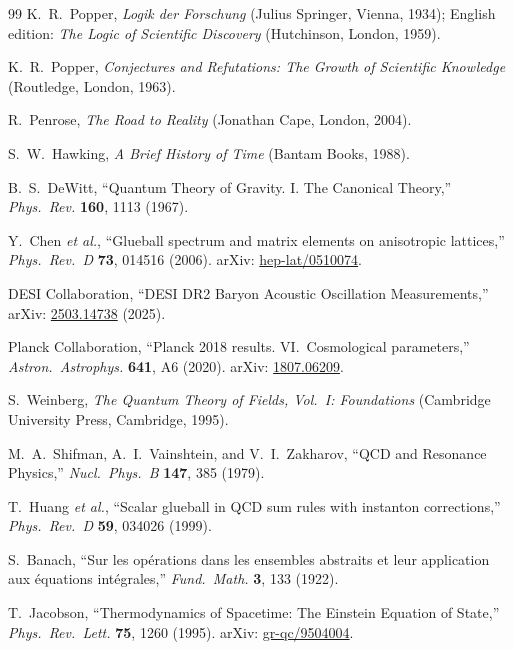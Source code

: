 \documentclass[12pt,a4paper,twoside]{article}
\theoremstyle{plain}
\theoremstyle{definition}
\theoremstyle{remark}
\begin{document}
\begin{thebibliography}{99}
K.~R.~Popper,
\emph{Logik der Forschung} (Julius Springer, Vienna, 1934);
English edition: \emph{The Logic of Scientific Discovery}
(Hutchinson, London, 1959).

K.~R.~Popper,
\emph{Conjectures and Refutations: The Growth of Scientific Knowledge}
(Routledge, London, 1963).

R.~Penrose,
\emph{The Road to Reality} (Jonathan Cape, London, 2004).

S.~W.~Hawking,
\emph{A Brief History of Time} (Bantam Books, 1988).

B.~S.~DeWitt,
``Quantum Theory of Gravity. I. The Canonical Theory,''
\emph{Phys.\ Rev.} \textbf{160}, 1113 (1967).

Y.~Chen \emph{et al.},
``Glueball spectrum and matrix elements on anisotropic lattices,''
\emph{Phys.\ Rev.\ D} \textbf{73}, 014516 (2006).
arXiv: \href{https://arxiv.org/abs/hep-lat/0510074}{hep-lat/0510074}.

DESI Collaboration,
``DESI DR2 Baryon Acoustic Oscillation Measurements,''
arXiv: \href{https://arxiv.org/abs/2503.14738}{2503.14738} (2025).

Planck Collaboration,
``Planck 2018 results. VI.\ Cosmological parameters,''
\emph{Astron.\ Astrophys.} \textbf{641}, A6 (2020).
arXiv: \href{https://arxiv.org/abs/1807.06209}{1807.06209}.

S.~Weinberg,
\emph{The Quantum Theory of Fields, Vol.~I: Foundations}
(Cambridge University Press, Cambridge, 1995).

M.~A.~Shifman, A.~I.~Vainshtein, and V.~I.~Zakharov,
``QCD and Resonance Physics,''
\emph{Nucl.\ Phys.\ B} \textbf{147}, 385 (1979).

T.~Huang \emph{et al.},
``Scalar glueball in QCD sum rules with instanton corrections,''
\emph{Phys.\ Rev.\ D} \textbf{59}, 034026 (1999).

S.~Banach,
``Sur les op\'erations dans les ensembles abstraits et leur application
aux \'equations int\'egrales,''
\emph{Fund.\ Math.} \textbf{3}, 133 (1922).

T.~Jacobson,
``Thermodynamics of Spacetime: The Einstein Equation of State,''
\emph{Phys.\ Rev.\ Lett.} \textbf{75}, 1260 (1995).
arXiv: \href{https://arxiv.org/abs/gr-qc/9504004}{gr-qc/9504004}.


\end{thebibliography}
\end{document}
